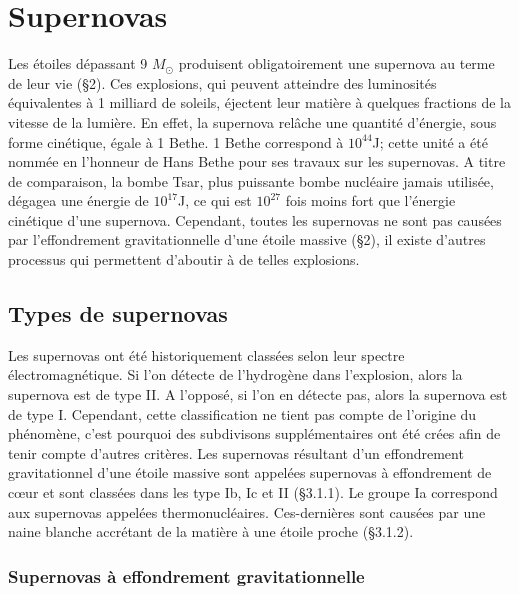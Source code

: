 

\chapter{Supernovas}

Les étoiles dépassant 9 $M_\odot$ produisent obligatoirement une supernova au terme de leur vie (§2). Ces explosions, qui peuvent atteindre des luminosités équivalentes à 1 milliard de soleils, éjectent leur matière à quelques fractions de la vitesse de la lumière. En effet, la supernova relâche une quantité d'énergie, sous forme cinétique, égale à 1 Bethe. 1 Bethe correspond à $10^{44}$J; cette unité a été nommée en l'honneur de Hans Bethe pour ses travaux sur les supernovas. A titre de comparaison, la bombe Tsar, plus puissante bombe nucléaire jamais utilisée, dégagea une énergie de $10^{17}$J, ce qui est $10^{27}$ fois moins fort que l'énergie cinétique d'une supernova. %
Cependant, toutes les supernovas ne sont pas causées par l'effondrement gravitationnelle d'une étoile massive (§2), il existe d'autres processus qui permettent d'aboutir à de telles explosions.\bigskip

\section{Types de supernovas} \medskip

Les supernovas ont été historiquement classées selon leur spectre électromagnétique. Si l'on détecte de l'hydrogène dans l'explosion, alors la supernova est de type II. A l'opposé, si l'on en détecte pas, alors la supernova est de type I. Cependant, cette classification ne tient pas compte de l'origine du phénomène, c'est pourquoi des subdivisons supplémentaires ont été crées afin de tenir compte d'autres critères. Les supernovas résultant d'un effondrement gravitationnel d'une étoile massive sont appelées supernovas à effondrement de cœur et sont classées dans les type Ib, Ic et II (§3.1.1). Le groupe Ia correspond aux supernovas appelées thermonucléaires. Ces-dernières sont causées par une naine blanche accrétant de la matière à une étoile proche (§3.1.2).\bigskip

\subsection{Supernovas à effondrement gravitationnelle }\medskip


